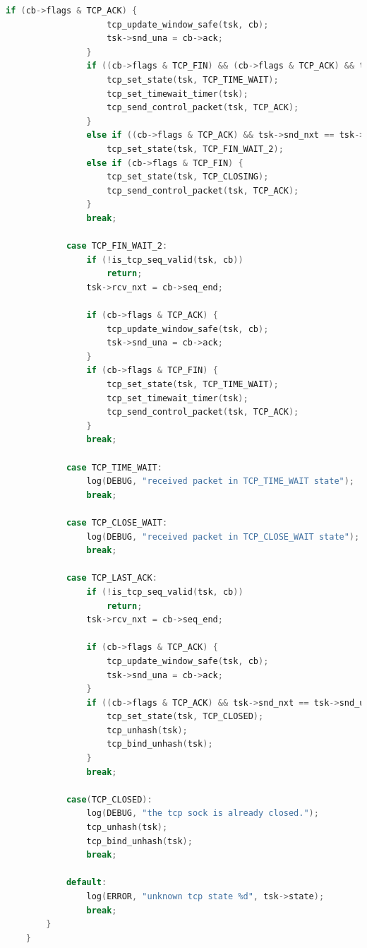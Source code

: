 \documentclass[UTF8]{report}
\begin{document}
\begin{lstlisting}[language=C]
                if (cb->flags & TCP_ACK) {
                    tcp_update_window_safe(tsk, cb);
                    tsk->snd_una = cb->ack;
                }
                if ((cb->flags & TCP_FIN) && (cb->flags & TCP_ACK) && tsk->snd_nxt == tsk->snd_una) {
                    tcp_set_state(tsk, TCP_TIME_WAIT);
                    tcp_set_timewait_timer(tsk);
                    tcp_send_control_packet(tsk, TCP_ACK);
                }
                else if ((cb->flags & TCP_ACK) && tsk->snd_nxt == tsk->snd_una) 
                    tcp_set_state(tsk, TCP_FIN_WAIT_2);
                else if (cb->flags & TCP_FIN) {
                    tcp_set_state(tsk, TCP_CLOSING);
                    tcp_send_control_packet(tsk, TCP_ACK);
                }
                break;
    
            case TCP_FIN_WAIT_2:
                if (!is_tcp_seq_valid(tsk, cb))
                    return;
                tsk->rcv_nxt = cb->seq_end;
    
                if (cb->flags & TCP_ACK) {
                    tcp_update_window_safe(tsk, cb);
                    tsk->snd_una = cb->ack;
                }
                if (cb->flags & TCP_FIN) {
                    tcp_set_state(tsk, TCP_TIME_WAIT);
                    tcp_set_timewait_timer(tsk);
                    tcp_send_control_packet(tsk, TCP_ACK);
                }
                break;
    
            case TCP_TIME_WAIT:
                log(DEBUG, "received packet in TCP_TIME_WAIT state");
                break;
    
            case TCP_CLOSE_WAIT:
                log(DEBUG, "received packet in TCP_CLOSE_WAIT state");
                break;
    
            case TCP_LAST_ACK:
                if (!is_tcp_seq_valid(tsk, cb))
                    return;
                tsk->rcv_nxt = cb->seq_end;
    
                if (cb->flags & TCP_ACK) {
                    tcp_update_window_safe(tsk, cb);
                    tsk->snd_una = cb->ack;
                }
                if ((cb->flags & TCP_ACK) && tsk->snd_nxt == tsk->snd_una) {
                    tcp_set_state(tsk, TCP_CLOSED);
                    tcp_unhash(tsk);
                    tcp_bind_unhash(tsk);
                }
                break;
    
            case(TCP_CLOSED):
                log(DEBUG, "the tcp sock is already closed.");
                tcp_unhash(tsk);
                tcp_bind_unhash(tsk);
                break;
    
            default:
                log(ERROR, "unknown tcp state %d", tsk->state);
                break;
        }
    }
\end{lstlisting}
\end{document}
